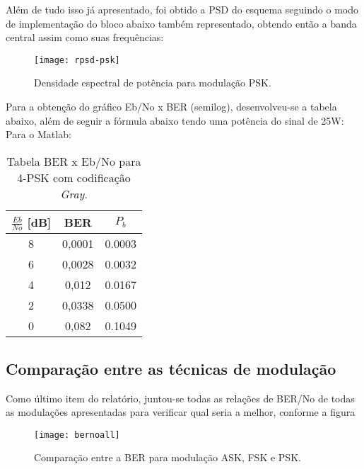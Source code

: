 Além de tudo isso já apresentado, foi obtido a PSD do esquema seguindo o modo de implementação do bloco abaixo também representado, obtendo então a banda central assim como suas frequências:

\begin{figure}[H]
    \centering
    \texttt{[image: rpsd-psk]}
    \caption{Densidade espectral de potência para modulação PSK.}
    \label{fig:rpsdpsk}
\end{figure}

Para a obtenção do gráfico Eb/No x BER (semilog), desenvolveu-se a tabela abaixo, além de seguir a fórmula abaixo tendo uma potência do sinal de 25W:
Para o Matlab:

\begin{small}
    \begin{table}[H]
        \begin{center}
            \caption{Tabela BER x Eb/No para 4-PSK com codificação \textit{Gray}.}
            \begin{tabular}{c|c|c}
                \hline
                $\frac{Eb}{No}$ [dB] & BER & $P_b$ \\
                \hline
                8 & 0,0001 & 0.0003\\
                \hline
                6 & 0,0028 & 0.0032 \\
                \hline
                4 & 0,012 & 0.0167 \\
                \hline
                2 & 0,0338 & 0.0500 \\
                \hline
                0 & 0,082 & 0.1049 \\
                \hline
            \end{tabular}
            \label{tab:3}
        \end{center}
    \end{table}
\end{small}

\subsection{Comparação entre as técnicas de modulação}

Como último item do relatório, juntou-se todas as relações de BER/No de todas as modulações apresentadas para verificar qual seria a melhor, conforme a figura 

\begin{figure}[H]
    \centering
    \texttt{[image: bernoall]}
    \caption{Comparação entre a BER para modulação ASK, FSK e PSK.}
    \label{fig:bernoall}
\end{figure}